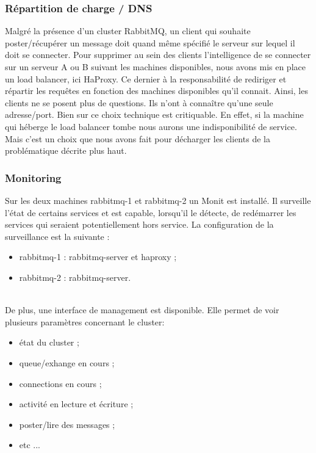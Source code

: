 \subsubsection{Répartition de charge / DNS}

Malgré la présence d'un cluster RabbitMQ, un client qui souhaite poster/récupérer un message doit quand même spécifié le serveur sur lequel il doit se connecter. Pour supprimer au sein des clients l'intelligence de se connecter sur un serveur A ou B suivant les machines disponibles, nous avons mis en place un load balancer, ici HaProxy. Ce dernier à la responsabilité de rediriger et répartir les requêtes en fonction des machines disponibles qu'il connait. Ainsi, les clients ne se posent plus de questions. Ils n'ont à connaître qu'une seule adresse/port. Bien sur ce choix technique est critiquable. En effet, si la machine qui héberge le load balancer tombe nous aurons une indisponibilité de service. Mais c'est un choix que nous avons fait pour décharger les clients de la problématique décrite plus haut.

\subsubsection{Monitoring}

Sur les deux machines rabbitmq-1 et rabbitmq-2 un Monit est installé. Il surveille l'état de certains services et est capable, lorsqu'il le détecte, de redémarrer les services qui seraient potentiellement hors service. La configuration de la surveillance est la suivante :
\begin{itemize}
	\item rabbitmq-1 : rabbitmq-server et haproxy ;
	\item rabbitmq-2 : rabbitmq-server.
\end{itemize}
\ \\
De plus, une interface de management est disponible. Elle permet de voir plusieurs paramètres concernant le cluster:
\begin{itemize}
	\item état du cluster ;
	\item queue/exhange en cours ;
	\item connections en cours ;
	\item activité en lecture et écriture ;
	\item poster/lire des messages ;
	\item etc ...
\end{itemize}

